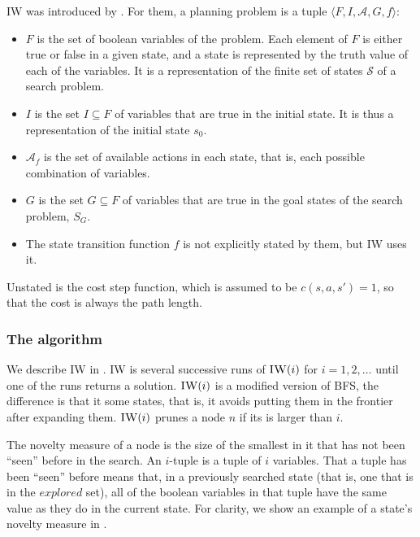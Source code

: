 \ac{IW} was introduced by \citet{lipovetzky2012width}. For them, a planning
problem is a tuple $\langle F, I, \mathcal{A}, G, f \rangle$:
\begin{itemize}
  \item $F$ is the set of boolean variables of the problem. Each element of $F$
is either true or false in a given state, and a state is represented by the
truth value of each of the variables. It is a representation of the finite set
of states $\mathcal{S}$ of a search problem.
\item $I$ is the set $I \subseteq F$ of variables that are true in the initial
  state. It is thus a representation of the initial state $s_0$.
\item $\mathcal{A}_f$ is the set of available actions in each state, that is,
  each possible combination of variables.
\item $G$ is the set $G \subseteq F$ of variables that are true in the goal
  states of the search problem, $S_G$.
\item The state transition function $f$ is not explicitly stated by them, but
\ac{IW} uses it.
\end{itemize}
Unstated is the cost step function, which is assumed to be $c(s,a,s') = 1$, so
that the cost is always the path length.

\subsubsection{The algorithm\label{subsec:iw-the-algorithm}}

We describe \ac{IW} in . \ac{IW} is several successive
runs of $\textsc{IW}(i)$ for $i=1,2,\dots$ until one of the runs returns a solution.
$\textsc{IW}(i)$ is a modified version of \ac{BFS}, the difference is that it
 some states, that is, it avoids putting them in the frontier
after expanding them. $\textsc{IW}(i)$ prunes a node $n$ if its  is larger than $i$.

The novelty measure of a node is the size of the smallest 
in it that has not been ``seen'' before in the search. An $i$-tuple is a tuple of
$i$ variables. That a tuple has been ``seen'' before means that, in a previously
searched state (that is, one that is in the $explored$ set), all of the boolean
variables in that tuple have the same value as they do in the current state. For
clarity, we show an example of a state's novelty measure in
.

